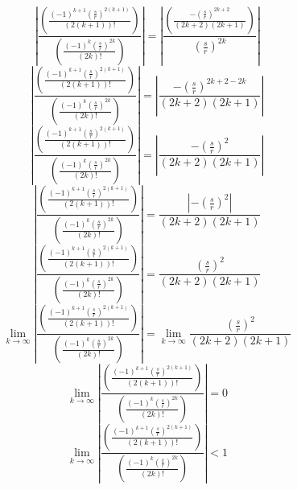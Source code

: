 \documentclass[a4paper,12pt]{report}
\begin{document}
\begin{equation}
\left|\frac{\left(\frac{(-1)^{k+1} \left(\frac{s}{r}\right)^{2(k+1)}}{(2(k+1))!}\right)}{\left(\frac{(-1)^k \left(\frac{s}{r}\right)^{2k}}{(2k)!}\right)}\right| = \left|\frac{\left(\frac{-\left(\frac{s}{r}\right)^{2k+2}}{(2k+2)(2k+1)}\right)}{\left(\frac{s}{r}\right)^{2k}}\right|
\end{equation}
\begin{equation}
\left|\frac{\left(\frac{(-1)^{k+1} \left(\frac{s}{r}\right)^{2(k+1)}}{(2(k+1))!}\right)}{\left(\frac{(-1)^k \left(\frac{s}{r}\right)^{2k}}{(2k)!}\right)}\right| = \left|\frac{-\left(\frac{s}{r}\right)^{2k+2-2k}}{(2k+2)(2k+1)}\right|
\end{equation}
\begin{equation}
\left|\frac{\left(\frac{(-1)^{k+1} \left(\frac{s}{r}\right)^{2(k+1)}}{(2(k+1))!}\right)}{\left(\frac{(-1)^k \left(\frac{s}{r}\right)^{2k}}{(2k)!}\right)}\right| = \left|\frac{-\left(\frac{s}{r}\right)^2}{(2k+2)(2k+1)}\right|
\end{equation}
\begin{equation}
\left|\frac{\left(\frac{(-1)^{k+1} \left(\frac{s}{r}\right)^{2(k+1)}}{(2(k+1))!}\right)}{\left(\frac{(-1)^k \left(\frac{s}{r}\right)^{2k}}{(2k)!}\right)}\right| = \frac{\left|-\left(\frac{s}{r}\right)^2\right|}{(2k+2)(2k+1)}
\end{equation}
\begin{equation}
\left|\frac{\left(\frac{(-1)^{k+1} \left(\frac{s}{r}\right)^{2(k+1)}}{(2(k+1))!}\right)}{\left(\frac{(-1)^k \left(\frac{s}{r}\right)^{2k}}{(2k)!}\right)}\right| = \frac{\left(\frac{s}{r}\right)^2}{(2k+2)(2k+1)}
\end{equation}
\begin{equation}
\lim \limits_{k \to \infty} \left|\frac{\left(\frac{(-1)^{k+1} \left(\frac{s}{r}\right)^{2(k+1)}}{(2(k+1))!}\right)}{\left(\frac{(-1)^k \left(\frac{s}{r}\right)^{2k}}{(2k)!}\right)}\right| = \lim \limits_{k \to \infty} \frac{\left(\frac{s}{r}\right)^2}{(2k+2)(2k+1)}
\end{equation}
\begin{equation}
\lim \limits_{k \to \infty} \left|\frac{\left(\frac{(-1)^{k+1} \left(\frac{s}{r}\right)^{2(k+1)}}{(2(k+1))!}\right)}{\left(\frac{(-1)^k \left(\frac{s}{r}\right)^{2k}}{(2k)!}\right)}\right| = 0
\end{equation}
\begin{equation}
\lim \limits_{k \to \infty} \left|\frac{\left(\frac{(-1)^{k+1} \left(\frac{s}{r}\right)^{2(k+1)}}{(2(k+1))!}\right)}{\left(\frac{(-1)^k \left(\frac{s}{r}\right)^{2k}}{(2k)!}\right)}\right| < 1
\end{equation}
\end{document}
